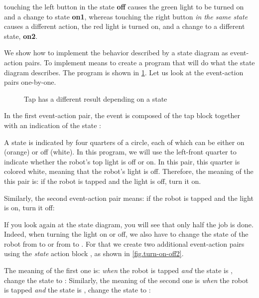 touching the left button in the state \textbf{off} causes the green
light to be turned on and a change to state \textbf{on1}, whereas
touching the right button \emph{in the same state} causes a different
action, the red light is turned on, and a change to a different state, \textbf{on2}.


We show how to implement the behavior described by a state diagram as event-action pairs.
To implement means to create a program that will do what the state diagram describes.
The program is shown in \cref{fig.turn-on-off}. Let us look
at the event-action pairs one-by-one.

\begin{figure}
	\hfill
	\caption{Tap has a different result depending on a state}
	\label{fig.turn-on-off}
\end{figure}

In the first event-action pair, the event is composed of the
tap block together with an indication of the state : 

A state is indicated by four quarters of a circle, each of which can be
either on (orange) or off (white). In this program, we will use the left-front quarter to
indicate whether the robot's top light is off or on. In this pair, this
quarter is colored white, meaning that the robot's light is off.
Therefore, the meaning of the this pair is: if the robot is tapped and the light is off, turn
it on.

Similarly, the second event-action pair means: if the robot
is tapped and the light is on, turn it off: 

If you look again at the state diagram, you
will see that only half the job is done. Indeed, when turning the light on or
off, we also have to change the state of the robot from  to
 or from  to . For that we create two
additional event-action pairs using the \emph{state} action block
, as shown in \cref{fig.turn-on-off2}.

The meaning of the first one is: \emph{when} the robot is tapped
\emph{and} the state is , change the state to :
Similarly, the meaning of the second one is \emph{when} the robot
is tapped \emph{and} the state is , change the state to : 

